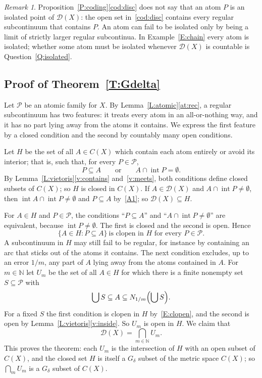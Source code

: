 \documentclass[11pt,reqno]{amsart}
\theoremstyle{plain}
\theoremstyle{definition}
\theoremstyle{remark}
\newtheorem{remark}[theorem]{Remark}
\newcommand{\D}{\mathcal{D}}
\newcommand{\PP}{\mathcal{P}}
\newcommand{\intr}{\operatorname{int}}
\newcommand{\N}{\mathbb{N}}
\begin{document}
\begin{remark}\label{R:notisolated}
Proposition~\ref{P:coding}\ref{cod:disc} does not say that an atom $P$ is an isolated point of $\D(X)$: the open set in~\ref{cod:disc} contains every regular subcontinuum that contains $P$. An atom can fail to be isolated only by being a limit of strictly larger regular subcontinua. In Example~\ref{E:chain} every atom is isolated; whether some atom must be isolated whenever $\D(X)$ is countable is Question~\ref{Q:isolated}.
\end{remark}

\subsection{Proof of Theorem~\ref{T:Gdelta}}
Let $\PP$ be an atomic family for $X$. By Lemma~\ref{L:atomic}\ref{at:rec}, a regular subcontinuum has two features: it treats every atom in an all-or-nothing way, and it has no part lying away from the atoms it contains. We express the first feature by a closed condition and the second by countably many open conditions.

Let $H$ be the set of all $A\in C(X)$ which contain each atom entirely or avoid its interior; that is, such that, for every $P\in\PP$,
\[
P\subseteq A\qquad\text{or}\qquad A\cap\intr P=\emptyset .
\]
By Lemma~\ref{L:vietoris}\ref{v:contains} and~\ref{v:meets}, both conditions define closed subsets of $C(X)$; so $H$ is closed in $C(X)$. If $A\in\D(X)$ and $A\cap\intr P\neq\emptyset$, then $\intr A\cap\intr P\neq\emptyset$ and $P\subseteq A$ by~\ref{A1}; so $\D(X)\subseteq H$.

For $A\in H$ and $P\in\PP$, the conditions ``$P\subseteq A$'' and ``$A\cap\intr P\neq\emptyset$'' are equivalent, because $\intr P\neq\emptyset$. The first is closed and the second is open. Hence
\begin{equation}\label{E:clopen}
\{A\in H:P\subseteq A\}\ \text{is clopen in }H\text{ for every }P\in\PP.
\end{equation}
A subcontinuum in $H$ may still fail to be regular, for instance by containing an arc that sticks out of the atoms it contains. The next condition excludes, up to an error $1/m$, any part of $A$ lying away from the atoms contained in $A$. For $m\in\N$ let $U_m$ be the set of all $A\in H$ for which there is a finite nonempty set $S\subseteq\PP$ with
\[
\bigcup S\subseteq A\subseteq N_{1/m}\Bigl(\bigcup S\Bigr).
\]
For a fixed $S$ the first condition is clopen in $H$ by~\eqref{E:clopen}, and the second is open by Lemma~\ref{L:vietoris}\ref{v:inside}. So $U_m$ is open in $H$. We claim that
\[
\D(X)=\bigcap_{m\in\N}U_m .
\]
This proves the theorem: each $U_m$ is the intersection of $H$ with an open subset of $C(X)$, and the closed set $H$ is itself a $G_\delta$ subset of the metric space $C(X)$; so $\bigcap_mU_m$ is a $G_\delta$ subset of $C(X)$.
\end{document}
